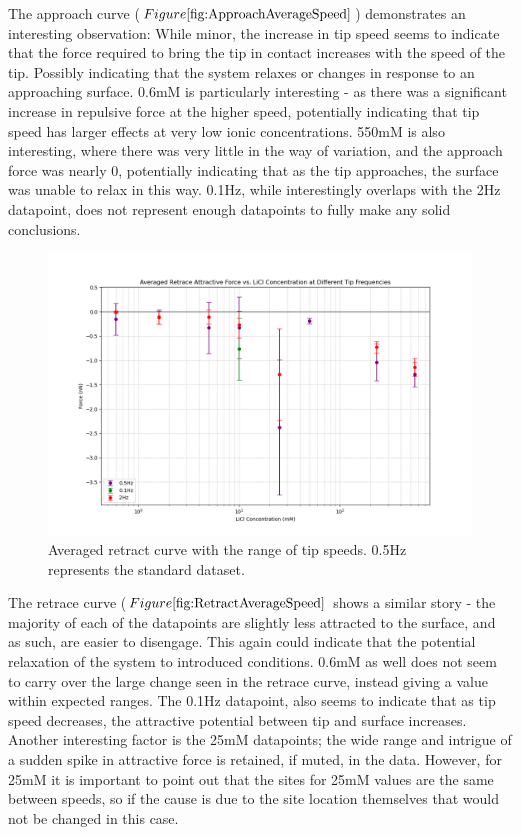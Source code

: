 The approach curve ($Figure \ref{fig:ApproachAverageSpeed}$) demonstrates an interesting observation: While minor, the increase in tip speed seems to indicate that the force required to bring the tip in contact increases with the speed of the tip. Possibly indicating that the system relaxes or changes in response to an approaching surface. 0.6mM is particularly interesting - as there was a significant increase in repulsive force at the higher speed, potentially indicating that tip speed has larger effects at very low ionic concentrations. 550mM is also interesting, where there was very little in the way of variation, and the approach force was nearly 0, potentially indicating that as the tip approaches, the surface was unable to relax in this way. 0.1Hz, while interestingly overlaps with the 2Hz datapoint, does not represent enough datapoints to fully make any solid conclusions. 

\begin{figure}[h!]
\centering
\includegraphics[width=\textwidth]{chapter7/Tip speed/Overall graph retrace.png}
\caption{Averaged retract curve with the range of tip speeds. 0.5Hz represents the standard dataset.}
\label{fig:RetractAverageSpeed}
\end{figure}

The retrace curve ($Figure \ref{fig:RetractAverageSpeed}$ shows a similar story - the majority of each of the datapoints are slightly less attracted to the surface, and as such, are easier to disengage. This again could indicate that the potential relaxation of the system to introduced conditions. 0.6mM as well does not seem to carry over the large change seen in the retrace curve, instead giving a value within expected ranges. The 0.1Hz datapoint, also seems to indicate that as tip speed decreases, the attractive potential between tip and surface increases. Another interesting factor is the 25mM datapoints; the wide range and intrigue of a sudden spike in attractive force is retained, if muted, in the data. However, for 25mM it is important to point out that the sites for 25mM values are the same between speeds, so if the cause is due to the site location themselves that would not be changed in this case.


